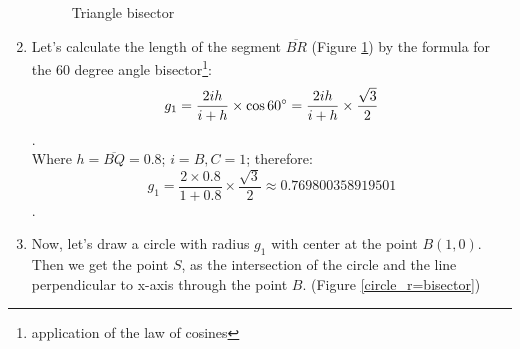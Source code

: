 \documentclass[12pt, letterpaper, oneside]{report}
\begin{document}
\begin{enumerate}
\begin{figure}[h]
	\caption{Triangle bisector}
	\label{bisector}
\end{figure} 
	\item Let's calculate the length of the segment $\overline{BR}$ (Figure \ref{bisector}) by the formula for the 60 degree angle bisector\footnote{application of the law of cosines }:
\begin{equation}
		 g_{1}=\frac{2ih}{i+h}\times \cos 60\degree = \frac{2ih}{i+h}\times\frac{\sqrt{3}}{2}
\end{equation}.\\
	Where $h=\overline{BQ}=0.8$; $i=B,C=1$; therefore:
\begin{equation}	
g_{1}=\frac{2\times0.8}{1+0.8}\times\frac{\sqrt{3}}{2}\approx 0.769800358919501
\end{equation}.\\
	\item Now, let's draw a circle with radius $g_{1}$ with center at the point $B(1,0)$. Then we get the point $S$, as the intersection of the circle and the line perpendicular to x-axis through the point $B$. (Figure \ref{circle_r=bisector})
	 

\end{enumerate}
\end{document}
